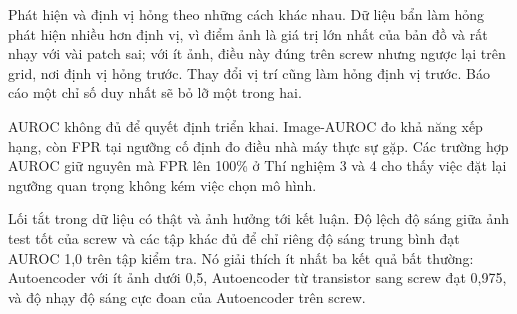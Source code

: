 Phát hiện và định vị hỏng theo những cách khác nhau. Dữ liệu bẩn làm hỏng phát hiện nhiều hơn định vị, vì điểm ảnh là
giá trị lớn nhất của bản đồ và rất nhạy với vài patch sai; với ít ảnh, điều này đúng trên screw nhưng ngược lại trên
grid, nơi định vị hỏng trước. Thay đổi vị trí cũng làm hỏng định vị trước. Báo cáo một chỉ số duy nhất sẽ bỏ lỡ một trong hai.

AUROC không đủ để quyết định triển khai. Image-AUROC đo khả năng xếp hạng, còn FPR tại ngưỡng cố định đo điều nhà máy
thực sự gặp. Các trường hợp AUROC giữ nguyên mà FPR lên 100\% ở Thí nghiệm 3 và 4 cho thấy việc đặt lại ngưỡng quan
trọng không kém việc chọn mô hình.

Lối tắt trong dữ liệu có thật và ảnh hưởng tới kết luận. Độ lệch độ sáng giữa ảnh test tốt của screw và các tập khác
đủ để chỉ riêng độ sáng trung bình đạt AUROC 1,0 trên tập kiểm tra. Nó giải thích ít nhất ba kết quả bất thường:
Autoencoder với ít ảnh dưới 0,5, Autoencoder từ transistor sang screw đạt 0,975, và độ nhạy độ sáng cực đoan của
Autoencoder trên screw.
